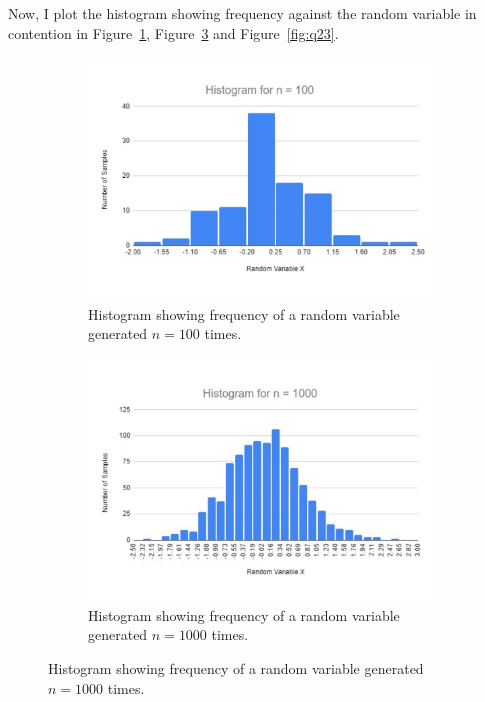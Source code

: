 \documentclass[titlepage, 11pt]{article}
\begin{document}
Now, I plot the histogram showing frequency against the random variable in contention in Figure~\ref{fig:q21}, Figure~\ref{fig:q22} and Figure~\ref{fig:q23}. \\

\begin{figure}[ht]
\begin{subfigure}{.5\textwidth}
  \centering
  \includegraphics[width=\linewidth]{HIS100.pdf}
  \caption{Histogram showing frequency of a random variable generated $n=100$ times. }
  \label{fig:q21}
\end{subfigure}
\begin{subfigure}{.5\textwidth}
  \centering
  \includegraphics[width=\linewidth]{HIS1000.pdf}
  \caption{Histogram showing frequency of a random variable generated $n=1000$ times. }
  \label{fig:q22}

\end{subfigure}
\end{figure}
\end{document}
